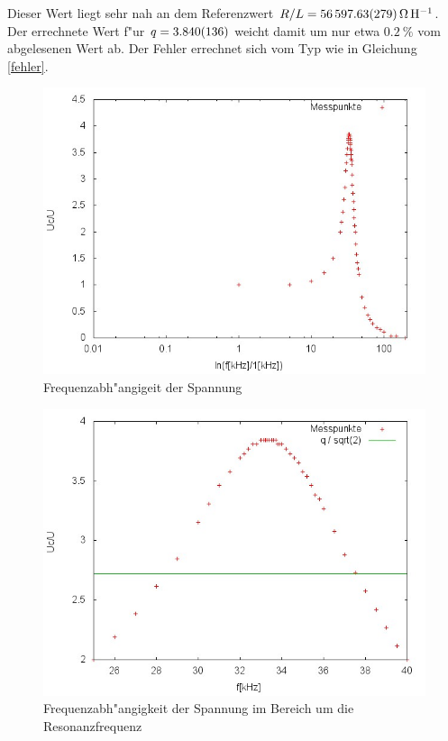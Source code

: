 	Dieser Wert liegt sehr nah an dem Referenzwert $R/L = \SI{56597.63 (279)}{\ohm \per \henry}$.
	Der errechnete Wert f"ur $q = \SI{3.840 (136)}{}$ weicht damit um nur etwa $\SI{0.2}{\%}$ vom abgelesenen Wert ab.
	Der Fehler errechnet sich vom Typ wie in Gleichung \eqref{fehler}.

	

\clearpage

	\begin{figure}[H]
		\centering
		\includegraphics[width = 12cm]{img/graph_c.jpg}
		\caption{Frequenzabh"angigeit der Spannung}
		\label{frequenz_1}
	\end{figure}

	\begin{figure}[H]
		\centering
		\includegraphics[width = 12cm]{img/graph_c_1.jpg}
		\caption{Frequenzabh"angigkeit der Spannung im Bereich um die Resonanzfrequenz}
		\label{frequenz_2}
	\end{figure}

